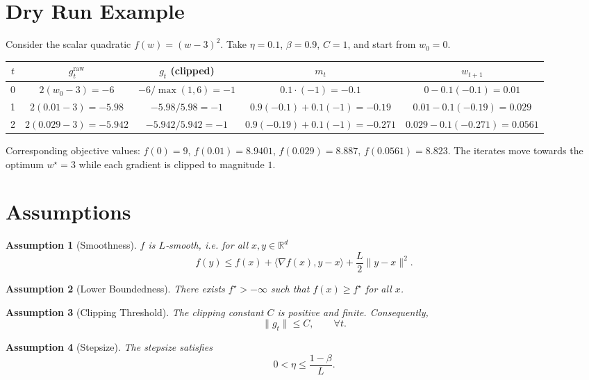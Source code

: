 \documentclass{article}
\newtheorem{assumption}{Assumption}
\begin{document}
\vspace{0.3cm}
\section*{Dry Run Example}
Consider the scalar quadratic $f(w)=(w-3)^2$.  
Take $\eta=0.1$, $\beta=0.9$, $C=1$, and start from $w_0=0$.

\begin{center}
\begin{tabular}{c|c|c|c|c}
$t$ & $g^{\text{raw}}_t$ & $g_t$ (clipped) & $m_t$ & $w_{t+1}$ \\ \hline
0 & $2(w_0-3)=-6$ & $-6/\max(1,6)= -1$ & $0.1\cdot(-1)=-0.1$ & $0-0.1(-0.1)=0.01$ \\[4pt]
1 & $2(0.01-3)=-5.98$ & $-5.98/5.98=-1$ & $0.9(-0.1)+0.1(-1)=-0.19$ & $0.01-0.1(-0.19)=0.029$ \\[4pt]
2 & $2(0.029-3)=-5.942$ & $-5.942/5.942=-1$ & $0.9(-0.19)+0.1(-1)=-0.271$ & $0.029-0.1(-0.271)=0.0561$ 
\end{tabular}
\end{center}

Corresponding objective values:
$f(0)=9$, $f(0.01)=8.9401$, $f(0.029)=8.887$, $f(0.0561)=8.823$.
The iterates move towards the optimum $w^\star=3$ while each
gradient is clipped to magnitude $1$.

\section*{Assumptions}
\begin{assumption}[Smoothness]\label{as:smooth}
$f$ is $L$‑smooth, i.e. for all $x,y\in\mathbb{R}^d$
\[
f(y)\le f(x)+\langle\nabla f(x),y-x\rangle+\frac{L}{2}\|y-x\|^2 .
\]
\end{assumption}

\begin{assumption}[Lower Boundedness]\label{as:lb}
There exists $f^\star>-\infty$ such that $f(x)\ge f^\star$ for all $x$.
\end{assumption}

\begin{assumption}[Clipping Threshold]\label{as:clip}
The clipping constant $C$ is positive and finite.
Consequently,
\[
\|g_t\|\le C,\qquad \forall t .
\tag{5}
\]
\end{assumption}

\begin{assumption}[Stepsize]\label{as:stepsize}
The stepsize satisfies
\[
0<\eta\le \frac{1-\beta}{L}.
\tag{6}
\]
\end{assumption}
\end{document}
